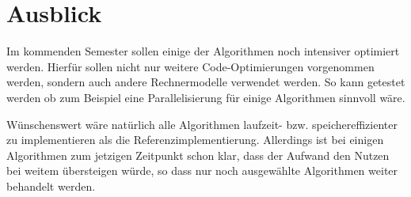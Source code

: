 \section{Ausblick}

Im  kommenden Semester sollen einige der Algorithmen noch intensiver optimiert werden.
Hierfür sollen nicht nur weitere Code-Optimierungen vorgenommen werden, sondern auch andere Rechnermodelle verwendet werden.
So kann getestet werden ob zum Beispiel eine Parallelisierung für einige Algorithmen sinnvoll wäre.

Wünschenswert wäre natürlich alle Algorithmen laufzeit- bzw. speichereffizienter zu implementieren als die Referenzimplementierung.
Allerdings ist bei einigen Algorithmen zum jetzigen Zeitpunkt schon klar,
dass der Aufwand den Nutzen bei weitem übersteigen würde, so dass nur noch ausgewählte Algorithmen weiter behandelt werden.